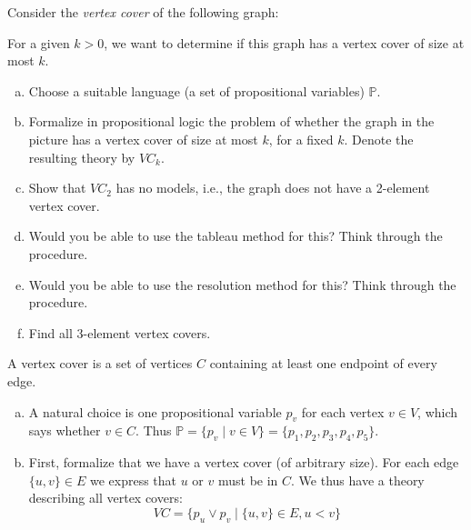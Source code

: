 \begin{problem}

    Consider the \emph{vertex cover} of the following graph:    
    \begin{center}
    \end{center}
    For a given $k>0$, we want to determine if this graph has a vertex cover of size at most $k$.

    \begin{enumerate}[(a)]
        \item Choose a suitable language (a set of propositional variables) $\mathbb P$.
        \item Formalize in propositional logic the problem of whether the graph in the picture has a vertex cover of size at most $k$, for a fixed $k$. Denote the resulting theory by ${VC}_k$.
        \item Show that ${VC}_2$ has no models, i.e., the graph does not have a 2-element vertex cover.
        \item Would you be able to use the tableau method for this? Think through the procedure.
        \item Would you be able to use the resolution method for this? Think through the procedure.
        \item Find all 3-element vertex covers.            
    \end{enumerate}

    \begin{solution}
        A vertex cover is a set of vertices $C$ containing at least one endpoint of every edge.
        \begin{enumerate}[(a)]
            \item A natural choice is one propositional variable $p_v$ for each vertex $v\in V$, which says whether $v\in C$. Thus $\mathbb P=\{p_v\mid v\in V\}=\{p_1,p_2,p_3,p_4,p_5\}$.
            \item First, formalize that we have a vertex cover (of arbitrary size). For each edge $\{u,v\}\in E$ we express that $u$ or $v$ must be in $C$. We thus have a theory describing all vertex covers:
            $$
            VC=\{p_u\lor p_v\mid \{u,v\}\in E, u<v\}
            $$
            

\end{enumerate}
\end{solution}
\end{problem}
